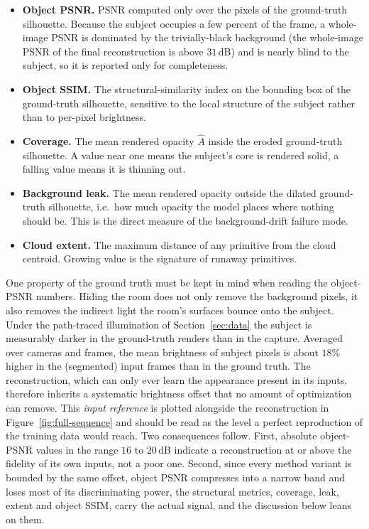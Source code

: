 \begin{itemize}
    \item \textbf{Object PSNR.} PSNR computed only over the pixels of the ground-truth
    silhouette. Because the subject occupies a few percent of the frame, a whole-image
    PSNR is dominated by the trivially-black background (the whole-image PSNR of the
    final reconstruction is above $31$\,dB) and is nearly blind to the subject, so it is
    reported only for completeness.
    
    \item \textbf{Object SSIM.} The structural-similarity index on the bounding box of
    the ground-truth silhouette, sensitive to the local structure of the subject rather
    than to per-pixel brightness.
    
    \item \textbf{Coverage.} The mean rendered opacity $\hat A$ inside the eroded
    ground-truth silhouette. A value near one means the subject's core is rendered
    solid, a falling value means it is thinning out.
    
    \item \textbf{Background leak.} The mean rendered opacity outside the dilated
    ground-truth silhouette, i.e.\ how much opacity the model places where nothing
    should be. This is the direct measure of the background-drift failure mode.
    
    \item \textbf{Cloud extent.} The maximum distance of any primitive from the cloud
    centroid. Growing value is the signature of runaway primitives.
\end{itemize}

One property of the ground truth must be kept in mind when reading the object-PSNR
numbers. Hiding the room does not only remove the background pixels, it also removes
the indirect light the room's surfaces bounce onto the subject. Under the
path-traced illumination of Section~\ref{sec:data} the subject is measurably darker in
the ground-truth renders than in the capture. Averaged over cameras and frames, the
mean brightness of subject pixels is about $18\%$ higher in the (segmented) input
frames than in the ground truth. The reconstruction, which can only ever learn the
appearance present in its inputs, therefore inherits a systematic brightness offset
that no amount of optimization can remove. This
\emph{input reference} is plotted alongside the reconstruction in
Figure~\ref{fig:full-sequence} and should be read as the level a perfect reproduction
of the training data would reach. Two consequences follow. First, absolute
object-PSNR values in the range $16$ to $20$\,dB indicate a reconstruction at or above
the fidelity of its own inputs, not a poor one. Second, since every method variant is
bounded by the same offset, object PSNR compresses into a narrow band and loses most
of its discriminating power, the structural metrics, coverage, leak, extent and object
SSIM, carry the actual signal, and the discussion below leans on them.

